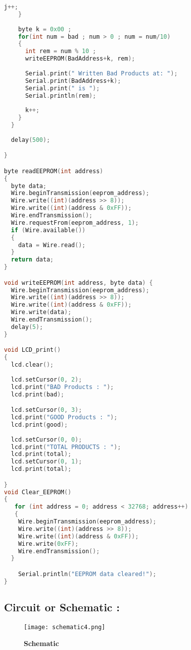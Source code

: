 \documentclass[12pt]{article}
\begin{document}
\begin{lstlisting}[language=C]
      j++;
    }
    
    byte k = 0x00 ;
    for(int num = bad ; num > 0 ; num = num/10)
    {
      int rem = num % 10 ;
      writeEEPROM(BadAddress+k, rem);
      
      Serial.print(" Written Bad Products at: ");
      Serial.print(BadAddress+k);
      Serial.print(" is ");
      Serial.println(rem);
      
      k++;
    }                 
  }  
    
  delay(500);

}

byte readEEPROM(int address) 
{
  byte data;
  Wire.beginTransmission(eeprom_address);
  Wire.write((int)(address >> 8)); 
  Wire.write((int)(address & 0xFF));
  Wire.endTransmission();
  Wire.requestFrom(eeprom_address, 1);
  if (Wire.available()) 
  {
    data = Wire.read();
  }
  return data;
}

void writeEEPROM(int address, byte data) {
  Wire.beginTransmission(eeprom_address);
  Wire.write((int)(address >> 8)); 
  Wire.write((int)(address & 0xFF)); 
  Wire.write(data);
  Wire.endTransmission();
  delay(5);  
}

void LCD_print()
{
  lcd.clear();
  
  lcd.setCursor(0, 2);
  lcd.print("BAD Products : ");
  lcd.print(bad);

  lcd.setCursor(0, 3);
  lcd.print("GOOD Products : ");
  lcd.print(good);
  
  lcd.setCursor(0, 0);
  lcd.print("TOTAL PRODUCTS : ");
  lcd.print(total);
  lcd.setCursor(0, 1);
  lcd.print(total);

}
void Clear_EEPROM()
{
   for (int address = 0; address < 32768; address++) 
   {
    Wire.beginTransmission(eeprom_address);
    Wire.write((int)(address >> 8));
    Wire.write((int)(address & 0xFF));
    Wire.write(0xFF);
    Wire.endTransmission();
  }

    Serial.println("EEPROM data cleared!");  
}


 \end{lstlisting}
 
  \subsection*{\textbf{Circuit or Schematic :}}
 
    \begin{figure}[h]
\centering
\texttt{[image: schematic4.png]}
\caption{\textbf{Schematic}}
\label{schematic_diagram4}
\end{figure}
 
\end{document}
